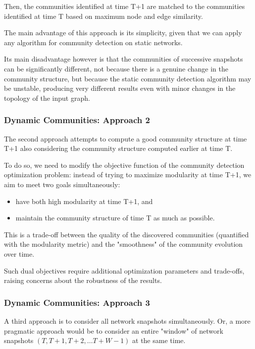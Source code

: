 \documentclass[11pt]{scrartcl} %
\begin{document}
Then, the communities identified at time T+1 are matched to the communities identified at time T based on maximum node and edge similarity.

The main advantage of this approach is its simplicity, given that we can apply any algorithm for community detection on static networks.

Its main disadvantage however is that the communities of successive snapshots can be significantly different, not because there is a genuine change in the community structure, but because the static community detection algorithm may be unstable, producing very different results even with minor changes in the topology of the input graph.

\subsubsection{Dynamic Communities: Approach 2}
The second approach attempts to compute a good community structure at time T+1 also considering the community structure computed earlier at time T.

To do so, we need to modify the objective function of the community detection optimization problem: instead of trying to maximize modularity at time T+1, we aim to meet two goals simultaneously: 
\begin{itemize}
	\item have both high modularity at time T+1, and
	\item maintain the community structure of time T as much as possible.
\end{itemize} 

This is a trade-off between the quality of the discovered communities (quantified with the modularity metric) and the "smoothness" of the community evolution over time.

Such dual objectives require additional optimization parameters and trade-offs, raising concerns about the robustness of the results. 

\subsubsection{Dynamic Communities: Approach 3}
A third approach is to consider all network snapshots simultaneously. Or, a more pragmatic approach would be to consider an entire "window" of network snapshots $(T, T+1, T+2, \dots T+W-1)$ at the same time.
\end{document}
